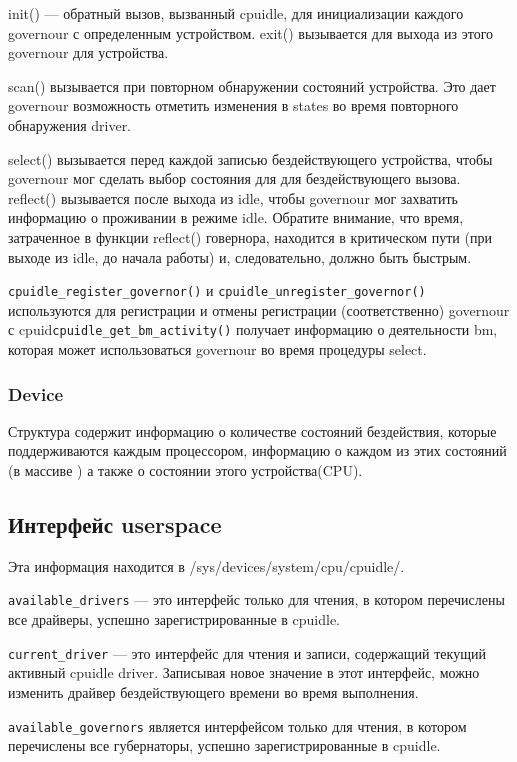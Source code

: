\documentclass{article}
\begin{document}
init() — обратный вызов, вызванный cpuidle, для инициализации каждого governour с определенным устройством. exit() вызывается для выхода из этого governour для устройства.

scan() вызывается при повторном обнаружении состояний устройства. Это дает governour возможность отметить изменения в states во время повторного обнаружения driver.

select() вызывается перед каждой записью бездействующего устройства, чтобы governour мог сделать выбор состояния для для бездействующего вызова. reflect() вызывается после выхода из idle, чтобы governour мог захватить информацию о проживании в режиме idle. Обратите внимание, что время, затраченное в функции reflect() говернора, находится в критическом пути (при выходе из idle, до начала работы) и, следовательно, должно быть быстрым.

\texttt{cpuidle\_register\_governor()}  и \texttt{cpuidle\_unregister\_governor()} используются для регистрации и отмены регистрации (соответственно) governour с cpuid\texttt{cpuidle\_get\_bm\_activity()} получает информацию о деятельности bm, которая может использоваться governour во время процедуры select.

\subsubsection{Device}
Структура содержит информацию о количестве состояний бездействия, которые поддерживаются каждым процессором, информацию о каждом из этих состояний (в массиве ) а также о состоянии этого устройства(CPU).


\subsection{Интерфейс userspace}

Эта информация находится в /sys/devices/system/cpu/cpuidle/.

\texttt{available\_drivers} — это интерфейс только для чтения, в котором перечислены все драйверы, успешно зарегистрированные в cpuidle.

\texttt{current\_driver} — это интерфейс для чтения и записи, содержащий текущий активный cpuidle driver. Записывая новое значение в этот интерфейс, можно изменить драйвер бездействующего времени во время выполнения.

\texttt{available\_governors} является интерфейсом только для чтения, в котором перечислены все губернаторы, успешно зарегистрированные в cpuidle.
\end{document}
